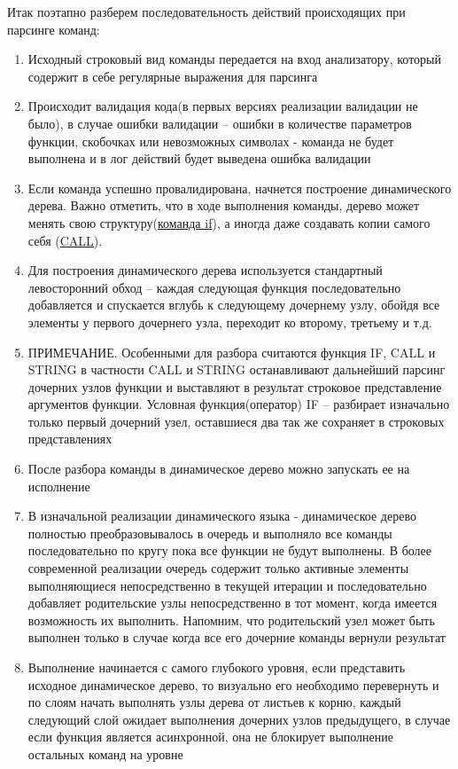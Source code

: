 \documentclass[../index.tex]{subfiles}
\begin{document}
Итак поэтапно разберем последовательность действий происходящих при парсинге команд:
\begin{enumerate}
    \item Исходный строковый вид команды передается на вход анализатору, который содержит в себе регулярные выражения для парсинга
    \item Происходит валидация кода(в первых версиях реализации валидации не было), в случае ошибки валидации -- ошибки в количестве параметров функции, скобочках или невозможных символах - команда не будет выполнена и в лог действий будет выведена ошибка валидации
    \item Если команда успешно провалидирована, начнется построение динамического дерева. Важно отметить, что в ходе выполнения команды, дерево может менять свою структуру(\hyperref[sec:fif]{команда if}), а иногда даже создавать копии самого себя (\hyperref[sec:fcall]{CALL}). 
    \item Для построения динамического дерева используется стандартный левосторонний обход -- каждая следующая функция последовательно добавляется и спускается вглубь к следующему дочернему узлу, обойдя все элементы у первого дочернего узла, переходит ко второму, третьему и т.д.
    \item ПРИМЕЧАНИЕ. Особенными для разбора считаются функция IF, CALL и STRING в частности CALL и STRING останавливают дальнейший парсинг дочерних узлов функции и выставляют в результат строковое представление аргументов функции. Условная функция(оператор) IF -- разбирает изначально только первый дочерний узел, оставшиеся два так же сохраняет в строковых представлениях
    \item После разбора команды в динамическое дерево можно запускать ее на исполнение 
    \item В изначальной реализации динамического языка - динамическое дерево полностью преобразовывалось в очередь и выполняло все команды последовательно по кругу пока все функции не будут выполнены. В более современной реализации очередь содержит только активные элементы выполняющиеся непосредственно в текущей итерации и последовательно добавляет родительские узлы непосредственно в тот момент, когда имеется возможность их выполнить. Напомним, что родительский узел может быть выполнен только в случае когда все его дочерние команды вернули результат
    \item Выполнение начинается с самого глубокого уровня, если представить исходное динамическое дерево, то визуально его необходимо перевернуть и по слоям начать выполнять узлы дерева от листьев к корню, каждый следующий слой ожидает выполнения дочерних узлов предыдущего, в случае если функция является асинхронной, она не блокирует выполнение остальных команд на уровне

\end{enumerate}
\end{document}

